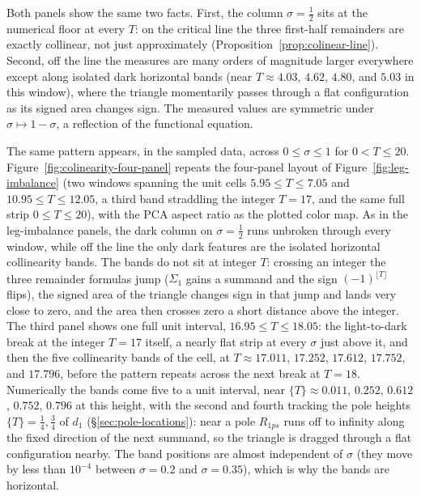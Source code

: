 \documentclass[11pt]{article}
\theoremstyle{definition}
\begin{document}
Both panels show the same two facts. First, the column $\sigma=\tfrac12$
sits at the numerical floor at every $T$: on the critical line the three
first-half remainders are exactly collinear, not just approximately
(Proposition~\ref{prop:colinear-line}). Second,
off the line the measures are many orders of magnitude larger everywhere
except along isolated dark horizontal bands (near $T\approx4.03$, $4.62$,
$4.80$, and $5.03$ in this window), where the triangle momentarily passes
through a flat configuration as its signed area changes sign. The measured
values are symmetric under $\sigma\mapsto1-\sigma$, a reflection of the
functional equation.

The same pattern appears, in the sampled data, across $0\le\sigma\le1$
for $0<T\le20$.
Figure~\ref{fig:colinearity-four-panel} repeats the four-panel layout of
Figure~\ref{fig:leg-imbalance} (two windows spanning the unit cells
$5.95\le T\le7.05$ and $10.95\le T\le12.05$, a third band straddling the
integer $T=17$, and the same full strip
$0\le T\le20$), with the PCA aspect ratio as the plotted color map.
As in the leg-imbalance panels, the dark column on $\sigma=\tfrac12$ runs
unbroken through every window, while off the line the only dark features are
the isolated horizontal collinearity bands. The bands do not sit at integer
$T$: crossing an integer the three remainder formulas jump ($\Sigma_1$ gains
a summand and the sign $(-1)^{\lfloor T\rfloor}$ flips), the signed area of
the triangle changes sign in that jump and lands very close to zero, and the
area then crosses zero a short distance above the integer. The third panel
shows one full unit interval, $16.95\le T\le18.05$: the light-to-dark break
at the integer $T=17$ itself, a nearly flat strip at every $\sigma$ just
above it, and then the five collinearity bands of the cell, at
$T\approx17.011$, $17.252$, $17.612$, $17.752$, and $17.796$, before the
pattern repeats across the next break at $T=18$. Numerically the bands come
five to a unit interval, near $\{T\}\approx0.011$, $0.252$, $0.612$,
$0.752$, $0.796$
at this height, with the second and fourth tracking the pole heights
$\{T\}=\tfrac14,\tfrac34$ of $d_1$ (\S\ref{sec:pole-locations}): near a pole
$R_{1ps}$ runs off to infinity along the fixed direction of the next
summand, so the triangle is dragged through a flat configuration nearby.
The band positions are almost independent of $\sigma$ (they move by less
than $10^{-4}$ between $\sigma=0.2$ and $\sigma=0.35$), which is why the
bands are horizontal.
\end{document}

